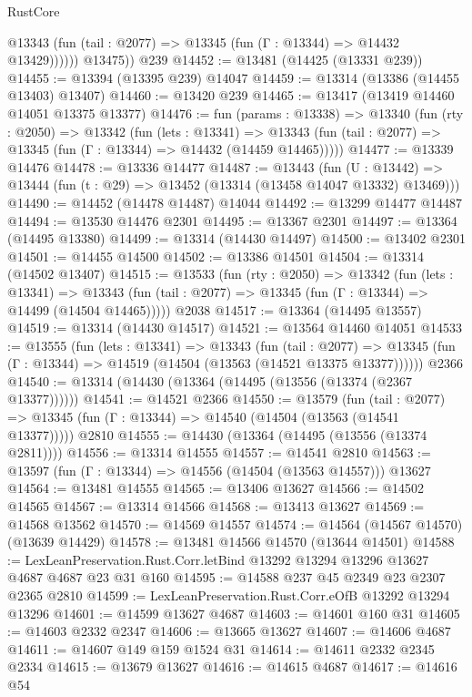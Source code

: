 \begin{lexlean}{RustCore}
\begin{coremodule}
              @13343 (fun (tail : @2077) => @13345 (fun (Γ : @13344) => @14432 @13429))))))
        @13475))
    @239
@14452 := @13481 (@14425 (@13331 @239))
@14455 := @13394 (@13395 @239) @14047
@14459 := @13314 (@13386 (@14455 @13403) @13407)
@14460 := @13420 @239
@14465 := @13417 (@13419 @14460 @14051 @13375 @13377)
@14476 := fun (params : @13338) =>
  @13340
    (fun (rty : @2050) =>
    @13342
      (fun (lets : @13341) =>
      @13343 (fun (tail : @2077) => @13345 (fun (Γ : @13344) => @14432 (@14459 @14465)))))
@14477 := @13339 @14476
@14478 := @13336 @14477
@14487 := @13443
    (fun (U : @13442) => @13444 (fun (t : @29) => @13452 (@13314 (@13458 @14047 @13332) @13469)))
@14490 := @14452 (@14478 @14487) @14044
@14492 := @13299 @14477 @14487
@14494 := @13530 @14476 @2301
@14495 := @13367 @2301
@14497 := @13364 (@14495 @13380)
@14499 := @13314 (@14430 @14497)
@14500 := @13402 @2301
@14501 := @14455 @14500
@14502 := @13386 @14501
@14504 := @13314 (@14502 @13407)
@14515 := @13533
    (fun (rty : @2050) =>
    @13342
      (fun (lets : @13341) =>
      @13343 (fun (tail : @2077) => @13345 (fun (Γ : @13344) => @14499 (@14504 @14465)))))
    @2038
@14517 := @13364 (@14495 @13557)
@14519 := @13314 (@14430 @14517)
@14521 := @13564 @14460 @14051
@14533 := @13555
    (fun (lets : @13341) =>
    @13343
      (fun (tail : @2077) =>
      @13345 (fun (Γ : @13344) => @14519 (@14504 (@13563 (@14521 @13375 @13377))))))
    @2366
@14540 := @13314 (@14430 (@13364 (@14495 (@13556 (@13374 (@2367 @13377))))))
@14541 := @14521 @2366
@14550 := @13579
    (fun (tail : @2077) => @13345 (fun (Γ : @13344) => @14540 (@14504 (@13563 (@14541 @13377)))))
    @2810
@14555 := @14430 (@13364 (@14495 (@13556 (@13374 @2811))))
@14556 := @13314 @14555
@14557 := @14541 @2810
@14563 := @13597 (fun (Γ : @13344) => @14556 (@14504 (@13563 @14557))) @13627
@14564 := @13481 @14555
@14565 := @13406 @13627
@14566 := @14502 @14565
@14567 := @13314 @14566
@14568 := @13413 @13627
@14569 := @14568 @13562
@14570 := @14569 @14557
@14574 := @14564 (@14567 @14570) (@13639 @14429)
@14578 := @13481 @14566 @14570 (@13644 @14501)
@14588 := LexLeanPreservation.Rust.Corr.letBind @13292 @13294 @13296 @13627 @4687 @4687 @23 @31 @160
@14595 := @14588 @237 @45 @2349 @23 @2307 @2365 @2810
@14599 := LexLeanPreservation.Rust.Corr.eOfB @13292 @13294 @13296
@14601 := @14599 @13627 @4687
@14603 := @14601 @160 @31
@14605 := @14603 @2332 @2347
@14606 := @13665 @13627
@14607 := @14606 @4687
@14611 := @14607 @149 @159 @1524 @31
@14614 := @14611 @2332 @2345 @2334
@14615 := @13679 @13627
@14616 := @14615 @4687
@14617 := @14616 @54

\end{coremodule}
\end{lexlean}

